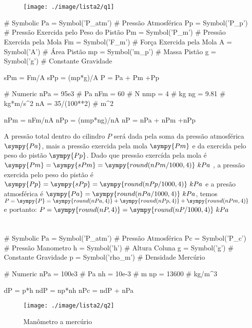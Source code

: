 \documentclass[a4paper,twocolumn,11pt]{article}
\title{\tituloRelatorio}
\newcommand{\npy}[1]{\sympy{round(n#1,4)}}
\newcommand{\epy}[1]{\sympy{#1} = \sympy{s#1}}
\begin{document}
\maketitle
\section{} %
\begin{figure}[H]
\centering
\texttt{[image: ./image/lista2/q1]}
\end{figure}

\begin{sympycode}
# Symbolic
Pa = Symbol('P_atm') # Pressão Atmosférica
Pp = Symbol('P_p') # Pressão Exercida pelo Peso do Pistão
Pm = Symbol('P_m') # Pressão Exercida pela Mola
Fm = Symbol('F_m') # Força Exercida pela Mola
A = Symbol('A') # Área Pistão
mp = Symbol('m_p') # Massa Pistão
g = Symbol('g') # Constante Gravidade

sPm = Fm/A
sPp = (mp*g)/A
P = Pa + Pm +Pp

# Numeric
nPa = 95e3 # Pa
nFm = 60 # N
nmp = 4 # kg
ng = 9.81 # kg*m/s^2
nA = 35/(100**2) # m^2

nPm = nFm/nA
nPp = (nmp*ng)/nA
nP = nPa + nPm +nPp
\end{sympycode}

A pressão total dentro do cilindro $P$ será dada pela soma da pressão atmosférica $\sympy{Pa}$, mais a pressão exercida pela mola $\sympy{Pm}$ e da exercida pelo peso do pistão $\sympy{Pp}$. Dado que pressão exercída pela mola é $\epy{Pm}= \npy{Pm/1000}\ kPa$ , a pressão exercida pelo peso do pistão é $\epy{Pp}= \npy{Pp/1000}\ kPa$ e a presão atmosférica é $\sympy{Pa} = \npy{Pa/1000}\ kPa$, temos $P = \sympy{P} = \npy{Pa} + \npy{Pp} + \npy{Pm}$ e portanto: $P = \npy{P} = \npy{P/1000}\ kPa$

\section{} %
\begin{sympycode}
# Symbolic
Pa = Symbol('P_atm') # Pressão Atmosférica
Pc = Symbol('P_c') # Pressão Manometro
h = Symbol('h') # Altura Coluna
g = Symbol('g') # Constante Gravidade
p = Symbol('rho_m') # Densidade Mercúrio

# Numeric
nPa = 100e3 # Pa
nh = 10e-3 # m
np = 13600 # kg/m^3

dP = p*h
ndP = np*nh
nPc = ndP + nPa

\end{sympycode}
\begin{figure}[ht]
\centering
\label{fig:l2q2}
\texttt{[image: ./image/lista2/q2]}
\caption{Manômetro a mercúrio}
\end{figure}
\end{document}
